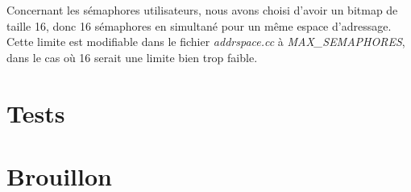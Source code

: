 \documentclass{article}
\begin{document}
Concernant les sémaphores utilisateurs, nous avons choisi d'avoir un bitmap de taille 16, donc 16 sémaphores en simultané pour un même espace d'adressage.
Cette limite est modifiable dans le fichier \textit{addrspace.cc} à \textit{MAX_SEMAPHORES}, dans le cas où 16 serait une limite bien trop faible.


\section{Tests}

\section{Brouillon}
\end{document}
